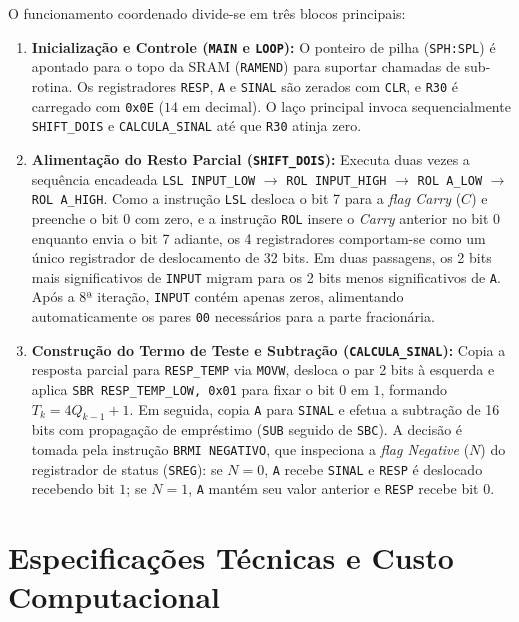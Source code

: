 \documentclass[conference]{IEEEtran}
\begin{document}
O funcionamento coordenado divide-se em três blocos principais:
\begin{enumerate}
	\item \textbf{Inicialização e Controle (\texttt{MAIN} e \texttt{LOOP}):} O ponteiro de pilha (\texttt{SPH:SPL}) é apontado para o topo da SRAM (\texttt{RAMEND}) para suportar chamadas de sub-rotina. Os registradores \texttt{RESP}, \texttt{A} e \texttt{SINAL} são zerados com \texttt{CLR}, e \texttt{R30} é carregado com \texttt{0x0E} ($14$ em decimal). O laço principal invoca sequencialmente \texttt{SHIFT\_DOIS} e \texttt{CALCULA\_SINAL} até que \texttt{R30} atinja zero.
	\item \textbf{Alimentação do Resto Parcial (\texttt{SHIFT\_DOIS}):} Executa duas vezes a sequência encadeada \texttt{LSL INPUT\_LOW} $\rightarrow$ \texttt{ROL INPUT\_HIGH} $\rightarrow$ \texttt{ROL A\_LOW} $\rightarrow$ \texttt{ROL A\_HIGH}. Como a instrução \texttt{LSL} desloca o bit 7 para a \textit{flag Carry} ($C$) e preenche o bit 0 com zero, e a instrução \texttt{ROL} insere o \textit{Carry} anterior no bit 0 enquanto envia o bit 7 adiante, os 4 registradores comportam-se como um único registrador de deslocamento de 32 bits. Em duas passagens, os 2 bits mais significativos de \texttt{INPUT} migram para os 2 bits menos significativos de \texttt{A}. Após a 8ª iteração, \texttt{INPUT} contém apenas zeros, alimentando automaticamente os pares \texttt{00} necessários para a parte fracionária.
	\item \textbf{Construção do Termo de Teste e Subtração (\texttt{CALCULA\_SINAL}):} Copia a resposta parcial para \texttt{RESP\_TEMP} via \texttt{MOVW}, desloca o par 2 bits à esquerda e aplica \texttt{SBR RESP\_TEMP\_LOW, 0x01} para fixar o bit 0 em $1$, formando $T_k = 4Q_{k-1} + 1$. Em seguida, copia \texttt{A} para \texttt{SINAL} e efetua a subtração de 16 bits com propagação de empréstimo (\texttt{SUB} seguido de \texttt{SBC}). A decisão é tomada pela instrução \texttt{BRMI NEGATIVO}, que inspeciona a \textit{flag Negative} ($N$) do registrador de status (\texttt{SREG}): se $N = 0$, \texttt{A} recebe \texttt{SINAL} e \texttt{RESP} é deslocado recebendo bit $1$; se $N = 1$, \texttt{A} mantém seu valor anterior e \texttt{RESP} recebe bit $0$.
\end{enumerate}

\section{Especificações Técnicas e Custo Computacional}
\end{document}
